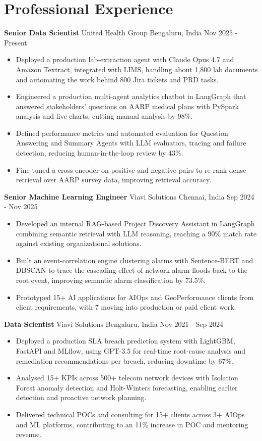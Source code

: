 \documentclass[10pt,a4paper]{article}
\newcommand{\role}[4]{\textbf{#1} \textbar{} #2 \hfill #3 \textbar{} #4\par}
\begin{document}
\section{Professional Experience}
\role{Senior Data Scientist}{United Health Group}{Bengaluru, India}{Nov 2025 - Present}
\begin{itemize}
  \item Deployed a production lab-extraction agent with Claude Opus 4.7 and Amazon Textract, integrated with LIMS, handling about 1,800 lab documents and automating the work behind 800 Jira tickets and PRD tasks.
  \item Engineered a production multi-agent analytics chatbot in LangGraph that answered stakeholders' questions on AARP medical plans with PySpark analysis and live charts, cutting manual analysis by 98\%.
  \item Defined performance metrics and automated evaluation for Question Answering and Summary Agents with LLM evaluators, tracing and failure detection, reducing human-in-the-loop review by 43\%.
  \item Fine-tuned a cross-encoder on positive and negative pairs to re-rank dense retrieval over AARP survey data, improving retrieval accuracy.
\end{itemize}
\vspace{3pt}
\role{Senior Machine Learning Engineer}{Viavi Solutions}{Chennai, India}{Sep 2024 - Nov 2025}
\begin{itemize}
  \item Developed an internal RAG-based Project Discovery Assistant in LangGraph combining semantic retrieval with LLM reasoning, reaching a 90\% match rate against existing organizational solutions.
  \item Built an event-correlation engine clustering alarms with Sentence-BERT and DBSCAN to trace the cascading effect of network alarm floods back to the root event, improving semantic alarm classification by 73.5\%.
  \item Prototyped 15+ AI applications for AIOps and GeoPerformance clients from client requirements, with 7 moving into production or paid client work.
\end{itemize}
\vspace{3pt}
\role{Data Scientist}{Viavi Solutions}{Bengaluru, India}{Nov 2021 - Sep 2024}
\begin{itemize}
  \item Deployed a production SLA breach prediction system with LightGBM, FastAPI and MLflow, using GPT-3.5 for real-time root-cause analysis and remediation recommendations per breach, reducing downtime by 67\%.
  \item Analysed 15+ KPIs across 500+ telecom network devices with Isolation Forest anomaly detection and Holt-Winters forecasting, enabling earlier detection and proactive network planning.
  \item Delivered technical POCs and consulting for 15+ clients across 3+ AIOps and ML platforms, contributing to an 11\% increase in POC and mentoring revenue.
\end{itemize}
\end{document}
